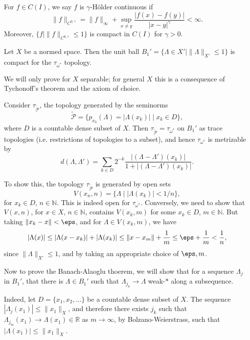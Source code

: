 \documentclass[12pt]{article}
\begin{document}
\begin{exbox}
	For $f \in C(I)$, we say $f$ is $\gamma$-H\"older continuous if
	\[
	\|f\|_{C^{0, \gamma}} = \|f\|_{\infty} + \sup_{x \neq y} \frac{|f(x) - f(y)|}{|x - y|^\gamma} < \infty.
	\]
	Moreover, $\{f \mid \|f\|_{C^{0, \gamma}} \leq 1\}$ is compact in $C(I)$ for $\gamma > 0$.
\end{exbox}

\begin{theorem}
	Let $X$ be a normed space. Then the unit ball $B_1' = \{\Lambda \in X' \mid \|\Lambda\|_{X'} \leq 1\}$ is compact for the $\tau_{\omega^{\ast}}$ topology.
\end{theorem}


\begin{proofbox}
	We will only prove for $X$ separable; for general $X$ this is a consequence of Tychonoff's theorem and the axiom of choice.

	Consider $\tau_{\tilde{\mathcal{P}}}$, the topology generated by the seminorms
	\[
		\tilde{\mathcal{P}} = \{ p_{x_k}(\Lambda) = |\Lambda(x_k)| \mid x_k \in D\},
	\]
	where $D$ is a countable dense subset of $X$. Then $\tau_{\tilde{\mathcal{P}}} = \tau_{\omega^{\ast}}$ on $B_1'$ as trace topologies (i.e. restrictions of topologies to a subset), and hence $\tau_{\omega^{\ast}}$ is metrizable by
	\[
	d(\Lambda, \Lambda') = \sum_{k \in D}2^{-k} \frac{|(\Lambda - \Lambda')(x_k)|}{1 + |(\Lambda - \Lambda')(x_k)|}.
	\]

	To show this, the topology $\tau_{\tilde{\mathcal{P}}}$ is generated by open sets
	\[
		V(x_n, n) = \{ \Lambda \mid |\Lambda(x_k)| < 1/n\},
	\]
	for $x_k \in D$, $n \in \mathbb{N}$. This is indeed open for $\tau_{\omega^{\ast}}$. Conversely, we need to show that $V(x,n)$, for $x \in X$, $n \in \mathbb{N}$, contains $V(x_k, m)$ for some $x_k \in D$, $m \in \mathbb{N}$. But taking $\|x_k - x\| < \eps$, and for $\Lambda \in V(x_k, m)$, we have
	 \[
	|\Lambda(x)| \leq |\Lambda(x - x_k)| + |\Lambda(x_k)| \leq \|x - x_m\| + \frac{1}{m} \leq \eps + \frac{1}{m} < \frac{1}{n},
	\]
	since $\|\Lambda\|_{X'} \leq 1$, and by taking an appropriate choice of $\eps, m$.

	Now to prove the Banach-Alaoglu thoerem, we will show that for a sequence $\Lambda_j$ in $B_1'$, that there is $\Lambda \in B_1'$ such that $\Lambda_{j_k} \to \Lambda$ weak-$\ast$ along a subsequence.

	Indeed, let $D = \{x_1, x_2, \ldots\}$ be a countable dense subset of $X$. The sequence $|\Lambda_j(x_1)| \leq \|x_1\|_X$, and therefore there exists $j_k$ such that $\Lambda_{j_m}(x_1) \to \Lambda(x_1) \in \mathbb{R}$ as $m \to \infty$, by Bolzano-Weierstrass, such that $|\Lambda(x_1)| \leq \|x_1\|_X$.


\end{proofbox}
\end{document}
